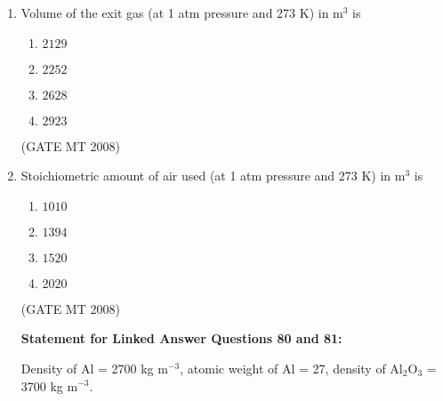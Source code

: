 \documentclass[11pt, letterpaper]{article}
\theoremstyle{remark}
\begin{document}
\begin{enumerate}[label=Q.\arabic*]
    \item Volume of the exit gas (at 1 atm pressure and 273 K) in m$^3$ is
    \begin{multicols}{4}
        \begin{enumerate}[label=(\MakeUppercase{\alph*})]
            \item $2129$
            \item $2252$
            \item $2628$
            \item $2923$
        \end{enumerate}
    \end{multicols}
\hfill(GATE MT 2008)
    \item Stoichiometric amount of air used (at 1 atm pressure and 273 K) in m$^3$ is
    \begin{multicols}{4}
        \begin{enumerate}[label=(\MakeUppercase{\alph*})]
            \item $1010$
            \item $1394$
            \item $1520$
            \item $2020$
        \end{enumerate}
    \end{multicols}
\hfill(GATE MT 2008)\\
    \vspace{0.5em}
    
    \textbf{Statement for Linked Answer Questions 80 and 81:}

    Density of Al = 2700 kg m$^{-3}$, atomic weight of Al = 27, density of Al$_2$O$_3$ = 3700 kg m$^{-3}$.


\end{enumerate}
\end{document}
